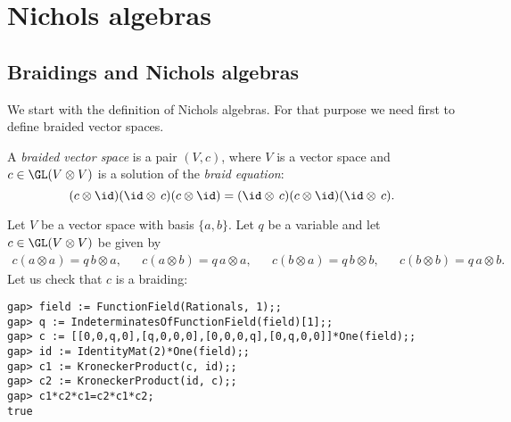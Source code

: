 \chapter{Nichols algebras}

\section{Braidings and Nichols algebras}

We start with the definition of Nichols algebras. For that purpose we need
first to define braided vector spaces. 

\begin{definition}
	A \emph{braided vector space} is a pair $(V,c)$, where $V$ is a vector
	space and $c\in\GL(V\otimes V)$ is a
	solution of the \emph{braid equation}:
	\[
	(c\otimes\id)(\id\otimes\, c)(c\otimes\id)
	=(\id\otimes\, c)(c\otimes\id)(\id\otimes\, c).
	\]
\end{definition}

%

\begin{example}
\label{exa:Yamane}
Let $V$ be a vector space with basis $\{a,b\}$. Let $q$ be a variable and let $c\in\GL(V\otimes V)$ be given by
\begin{align*}
	c(a\otimes a)=q\,b\otimes a,&&
	c(a\otimes b)=q\,a\otimes a,&&
	c(b\otimes a)=q\,b\otimes b,&&
	c(b\otimes b)=q\,a\otimes b.
\end{align*}
Let us check that $c$ is a braiding:
\begin{lstlisting}
gap> field := FunctionField(Rationals, 1);;
gap> q := IndeterminatesOfFunctionField(field)[1];;
gap> c := [[0,0,q,0],[q,0,0,0],[0,0,0,q],[0,q,0,0]]*One(field);;
gap> id := IdentityMat(2)*One(field);;
gap> c1 := KroneckerProduct(c, id);;
gap> c2 := KroneckerProduct(id, c);;
gap> c1*c2*c1=c2*c1*c2;
true
\end{lstlisting}
\end{example}

